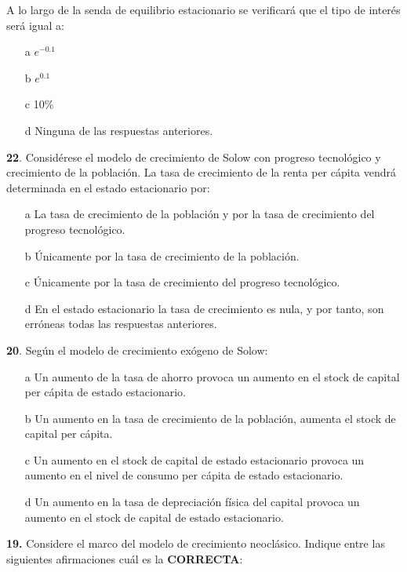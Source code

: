 \documentclass{nuevotema}
\begin{document}
A lo largo de la senda de equilibrio estacionario se verificará que el tipo de interés será igual a:

\begin{enumerate}
    \item[a] $e^{-0.1}$
    \item[b] $e^{0.1}$
    \item[c] 10\%
    \item[d] Ninguna de las respuestas anteriores.
\end{enumerate}

\textbf{22}. Considérese el modelo de crecimiento de Solow con progreso tecnológico y crecimiento de la población. La tasa de crecimiento de la renta per cápita vendrá determinada en el estado estacionario por:

\begin{enumerate}
    \item[a] La tasa de crecimiento de la población y por la tasa de crecimiento del progreso tecnológico.
    \item[b] Únicamente por la tasa de crecimiento de la población.
    \item[c] Únicamente por la tasa de crecimiento del progreso tecnológico.
    \item[d] En el estado estacionario la tasa de crecimiento es nula, y por tanto, son erróneas todas las respuestas anteriores.
\end{enumerate}


\textbf{20}. Según el modelo de crecimiento exógeno de Solow:
\begin{enumerate}
    \item[a] Un aumento de la tasa de ahorro provoca un aumento en el stock de capital per cápita de estado estacionario.
    \item[b] Un aumento en la tasa de crecimiento de la población, aumenta el stock de capital per cápita.
    \item[c] Un aumento en el stock de capital de estado estacionario provoca un aumento en el nivel de consumo per cápita de estado estacionario.
    \item[d] Un aumento en la tasa de depreciación física del capital provoca un aumento en el stock de capital de estado estacionario.
\end{enumerate}


\textbf{19.} Considere el marco del modelo de crecimiento neoclásico. Indique entre las siguientes afirmaciones cuál es la \textbf{CORRECTA}:
\end{document}
